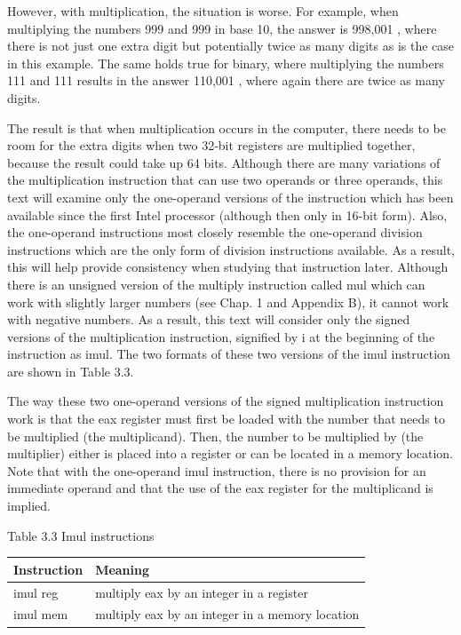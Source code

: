 \documentclass[10pt]{book}
\begin{document}
However, with multiplication, the situation is worse. For example, when multiplying the numbers 999 and 999 in base 10, the answer is 998,001 , where there is not just one extra digit but potentially twice as many digits as is the case in this example. The same holds true for binary, where multiplying the numbers 111 and 111 results in the answer 110,001 , where again there are twice as many digits.

The result is that when multiplication occurs in the computer, there needs to be room for the extra digits when two 32-bit registers are multiplied together, because the result could take up 64 bits. Although there are many variations of the multiplication instruction that can use two operands or three operands, this text will examine only the one-operand versions of the instruction which has been available since the first Intel processor (although then only in 16-bit form). Also, the one-operand instructions most closely resemble the one-operand division instructions which are the only form of division instructions available. As a result, this will help provide consistency when studying that instruction later. Although there is an unsigned version of the multiply instruction called mul which can work with slightly larger numbers (see Chap. 1 and Appendix B), it cannot work with negative numbers. As a result, this text will consider only the signed versions of the multiplication instruction, signified by i at the beginning of the instruction as imul. The two formats of these two versions of the imul instruction are shown in Table 3.3.

The way these two one-operand versions of the signed multiplication instruction work is that the eax register must first be loaded with the number that needs to be multiplied (the multiplicand). Then, the number to be multiplied by (the multiplier) either is placed into a register or can be located in a memory location. Note that with the one-operand imul instruction, there is no provision for an immediate operand and that the use of the eax register for the multiplicand is implied.

Table 3.3 Imul instructions

\begin{center}
\begin{tabular}{|l|l|}
\hline
Instruction & Meaning \\
\hline
imul reg & multiply eax by an integer in a register \\
\hline
imul mem & multiply eax by an integer in a memory location \\
\hline
\end{tabular}
\end{center}
\end{document}
